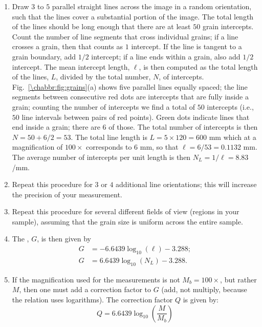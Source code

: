 \begin{enumerate}
	\item Draw $3$ to $5$ parallel straight lines across the image in a random orientation, such that the lines cover a substantial portion of the image.  The total length of the lines should be long enough that there are at least $50$ grain intercepts.  Count the number of line segments that cross individual grains; if a line crosses a grain, then that counts as $1$ intercept. If the line is tangent to a grain boundary, add $1/2$ intercept; if a line ends within a grain, also add $1/2$ intercept.  The mean intercept length, $\ell$, is then computed as the total length of the lines, $L$, divided by the total number, $N$, of intercepts.  Fig.~\ref{\chabbr:fig:grains}(a) shows five parallel lines equally spaced; the line segments between consecutive red dots are intercepts that are fully inside a grain; counting the number of intercepts we find a total of $50$ intercepts (i.e., $50$ line intervals between pairs of red points).  Green dots indicate lines that end inside a grain; there are $6$ of those.  The total number of intercepts is then $N=50+6/2=53$. The total line length is $L=5\times 120 = 600$ mm which at a magnification of $100\times$ corresponds to $6$ mm, so that $\ell=6/53=0.1132$ mm. The average number of intercepts per unit length is then $N_L=1/\ell=8.83$/mm.
	
	\item Repeat this procedure for $3$ or $4$ additional line orientations;  this will increase the precision of your measurement.
	
	\item Repeat this procedure for several different fields of view (regions in your sample), assuming that the grain
	size is uniform across the entire sample.

	\item The , $G$, is then given by
	\begin{align}
		G &= -6.6439\log_{10}(\ell) - 3.288;\\
		G &= 6.6439\log_{10}(N_L) - 3.288.
	\end{align}
	
	\item If the magnification used for the measurements is not $M_b=100\times$, but rather $M$, then
	one must add a correction factor to $G$ (add, not multiply, because the relation uses logarithms).  The correction factor $Q$ is given by:
	\[
		Q = 6.6439 \log_{10}\left(\frac{M}{M_b}\right)
	\]
\end{enumerate}


